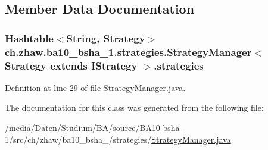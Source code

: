 \subsection{Member Data Documentation}
\hypertarget{classch_1_1zhaw_1_1ba10__bsha__1_1_1strategies_1_1StrategyManager_3_01Strategy_01extends_01IStrategy_01_4_adfc4680217e5979e5fac088970e0852f}{
\subsubsection[{strategies}]{\setlength{\rightskip}{0pt plus 5cm}Hashtable$<$String, Strategy$>$ ch.zhaw.ba10\_\-bsha\_\-1.strategies.StrategyManager$<$ Strategy extends {\bf IStrategy} $>$.{\bf strategies}}}
\label{classch_1_1zhaw_1_1ba10__bsha__1_1_1strategies_1_1StrategyManager_3_01Strategy_01extends_01IStrategy_01_4_adfc4680217e5979e5fac088970e0852f}


Definition at line 29 of file StrategyManager.java.

The documentation for this class was generated from the following file:\begin{DoxyCompactItemize}
\item 
/media/Daten/Studium/BA/source/BA10-\/bsha-\/1/src/ch/zhaw/ba10\_\-bsha\_/strategies/\hyperlink{StrategyManager_8java}{StrategyManager.java}\end{DoxyCompactItemize}

